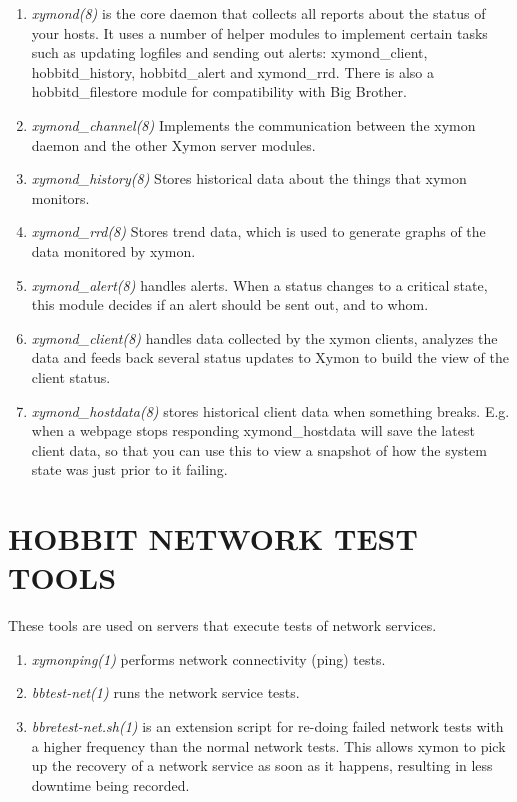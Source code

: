 \begin{enumerate}

 \item \emph{xymond(8)} is the core daemon that collects all reports about
 the status of your hosts. It uses a number of helper modules to
 implement certain tasks such as updating logfiles and sending out
 alerts: xymond\_client, hobbitd\_history, hobbitd\_alert and
 xymond\_rrd. There is also a hobbitd\_filestore module for
 compatibility with Big Brother. 



 \item \emph{xymond\_channel(8)}
 Implements the communication between the xymon daemon and the other Xymon server modules. 


 \item \emph{xymond\_history(8)}
 Stores historical data about the things that xymon monitors. 


 \item \emph{xymond\_rrd(8)}
 Stores trend data, which is used to generate graphs of the data monitored by xymon. 


 \item \emph{xymond\_alert(8)}
 handles alerts. When a status changes to a critical state, this module decides if an alert should be sent out, and to whom. 


 \item \emph{xymond\_client(8)}
 handles data collected by the xymon clients, analyzes the data and feeds back several status updates to Xymon to build the view of the client status. 


 \item \emph{xymond\_hostdata(8)}
 stores historical client data when something breaks. E.g. when a
 webpage stops responding xymond\_hostdata will save the latest
 client data, so that you can use this to view a snapshot of how the
 system state was just prior to it failing. 


\end{enumerate}
 
\section{HOBBIT NETWORK TEST TOOLS}

These tools are used on servers that execute tests of network
services. 

\begin{enumerate}

 \item \emph{xymonping(1)}
 performs network connectivity (ping) tests. 


 \item \emph{bbtest-net(1)}
 runs the network service tests. 


 \item \emph{bbretest-net.sh(1)} is an extension script for re-doing failed
 network tests with a higher frequency than the normal network
 tests. This allows xymon to pick up the recovery of a network
 service as soon as it happens, resulting in less downtime being
 recorded. 

\end{enumerate}



